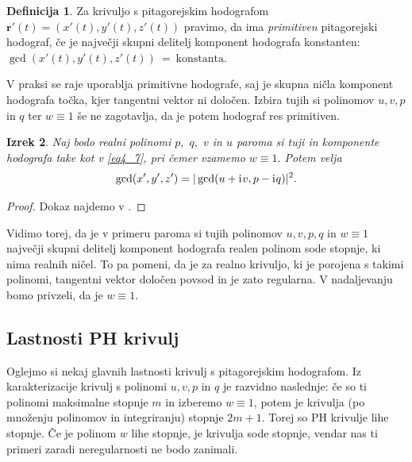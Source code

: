 \documentclass[12pt,a4paper,twoside]{article}
\newcommand{\iu}{\mathrm{i}\mkern1mu} %
\theoremstyle{definition} %
\newtheorem{definicija}{Definicija}[section]
\theoremstyle{plain} %
\newtheorem{izrek}[definicija]{Izrek}
\theoremstyle{primerstyle}
\numberwithin{equation}{section}  %
\newcommand{\rV}{\mathbf{r}}
\begin{document}
\begin{definicija}
	\label{primitiven_hodo}
	Za krivuljo s pitagorejskim hodografom $\rV'(t)=(x'(t),y'(t),z'(t))$ pravimo, da ima \emph{primitiven} pitagorejski hodograf, če je največji skupni delitelj komponent hodografa konstanten: $\gcd(x'(t),y'(t),z'(t))~=~\mathrm{konstanta}.$
\end{definicija}

V praksi se raje uporablja primitivne hodografe, saj je skupna ničla komponent hodografa točka, kjer tangentni vektor ni določen. Izbira tujih si polinomov $u,v,p$ in $q$ ter $w\equiv 1$ še ne zagotavlja, da je potem hodograf res primitiven. 

\begin{izrek}
	Naj bodo realni polinomi $p,$ $q,$ $v$ in $u$ paroma si tuji in komponente hodografa take kot v \eqref{eq4_7}, pri čemer vzamemo $w\equiv 1.$ Potem velja
	\begin{equation}
		\gcd(x',y',z')=|\gcd(u+\iu v,p-\iu q)|^2.
	\end{equation}
\end{izrek}
\begin{proof}
	Dokaz najdemo v \cite[str.\ 371]{faroukietal2004}.
\end{proof}

Vidimo torej, da je v primeru paroma si tujih polinomov $u,v,p,q$ in $w\equiv 1$ največji skupni delitelj komponent hodografa realen polinom sode stopnje, ki nima realnih ničel. To pa pomeni, da je za realno krivuljo, ki je porojena s takimi polinomi, tangentni vektor določen povsod in je zato regularna. V nadaljevanju bomo privzeli, da je $w\equiv 1.$

\subsection{Lastnosti PH krivulj}
\label{subsec_lastnosti}

Oglejmo si nekaj glavnih lastnosti krivulj s pitagorejskim hodografom. Iz karakterizacije krivulj s polinomi $u,v,p$ in $q$ je razvidno naslednje: če so ti polinomi maksimalne stopnje $m$ in izberemo $w\equiv1$, potem je krivulja (po množenju polinomov in integriranju) stopnje $2m+1.$ Torej so PH krivulje lihe stopnje. Če je polinom $w$ lihe stopnje, je krivulja sode stopnje, vendar nas ti primeri zaradi neregularnosti ne bodo zanimali.
\end{document}
